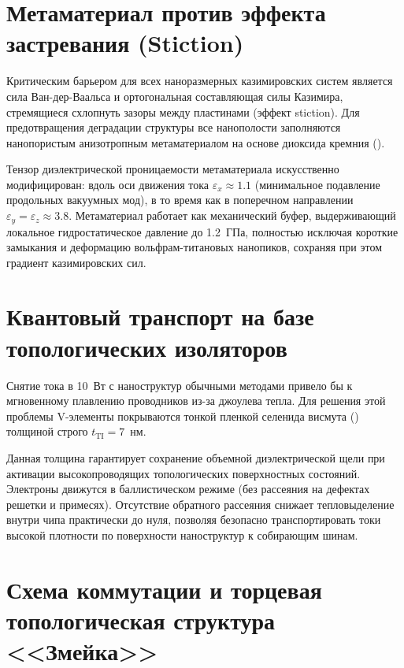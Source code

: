 \documentclass[11pt,a4paper]{article}
\begin{document}
\section{Метаматериал против эффекта застревания (Stiction)}

Критическим барьером для всех наноразмерных казимировских систем является сила
Ван-дер-Ваальса и ортогональная составляющая силы Казимира, стремящиеся
схлопнуть зазоры между пластинами (эффект stiction). Для предотвращения
деградации структуры все нанополости заполняются нанопористым анизотропным
метаматериалом на основе диоксида кремния ().

Тензор диэлектрической проницаемости метаматериала искусственно модифицирован:
вдоль оси движения тока $\varepsilon_x \approx 1.1$ (минимальное подавление
продольных вакуумных мод), в то время как в поперечном направлении
$\varepsilon_y = \varepsilon_z \approx 3.8$. Метаматериал работает как
механический буфер, выдерживающий локальное гидростатическое давление до
1.2~ГПа, полностью исключая короткие замыкания и деформацию
вольфрам-титановых нанопиков, сохраняя при этом градиент казимировских сил.

\section{Квантовый транспорт на базе топологических изоляторов}

Снятие тока в 10~Вт с наноструктур обычными методами привело бы к мгновенному
плавлению проводников из-за джоулева тепла. Для решения этой проблемы
V-элементы покрываются тонкой пленкой селенида висмута () толщиной
строго $t_{\mathrm{TI}} = 7$~нм.

Данная толщина гарантирует сохранение объемной диэлектрической щели при
активации высокопроводящих топологических поверхностных состояний. Электроны
движутся в баллистическом режиме (без рассеяния на дефектах решетки и
примесях). Отсутствие обратного рассеяния снижает тепловыделение внутри чипа
практически до нуля, позволяя безопасно транспортировать токи высокой плотности
по поверхности наноструктур к собирающим шинам.

\section{Схема коммутации и торцевая топологическая структура <<Змейка>>}
\end{document}
